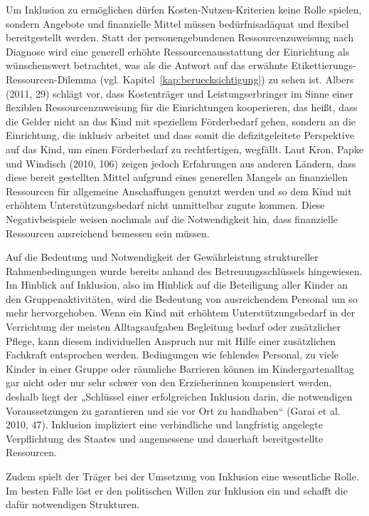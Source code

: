 Um Inklusion zu ermöglichen dürfen Kosten-Nutzen-Kriterien keine Rolle spielen, sondern Angebote und finanzielle Mittel müssen bedürfnisadäquat und flexibel bereitgestellt werden. Statt der personengebundenen Ressourcenzuweisung nach Diagnose wird eine generell erhöhte Ressourcenausstattung der Einrichtung als wünschenswert betrachtet, was als die Antwort auf das erwähnte Etikettierungs-Ressourcen-Dilemma (vgl. Kapitel~\ref{kap:beruecksichtigung}) zu sehen ist. 
Albers (2011, 29) schlägt vor, dass Kostenträger und Leistungserbringer im Sinne einer flexiblen Ressourcenzuweisung für die Einrichtungen kooperieren, das heißt, dass die Gelder nicht an das Kind mit speziellem Förderbedarf gehen, sondern an die Einrichtung, die inklusiv arbeitet und dass somit die defizitgeleitete Perspektive auf das Kind, um einen Förderbedarf zu rechtfertigen, wegfällt. Laut Kron, Papke und Windisch (2010, 106) zeigen jedoch Erfahrungen aus anderen Ländern, dass diese bereit gestellten Mittel aufgrund eines generellen Mangels an finanziellen Ressourcen für allgemeine Anschaffungen genutzt werden und so dem Kind mit erhöhtem Unterstützungsbedarf nicht unmittelbar zugute kommen. Diese Negativbeispiele weisen nochmals auf die Notwendigkeit hin, dass finanzielle Ressourcen ausreichend bemessen sein müssen.

Auf die Bedeutung und Notwendigkeit der Gewährleistung struktureller Rahmenbedingungen wurde bereits anhand des Betreuungsschlüssels hingewiesen. Im Hinblick auf Inklusion, also im Hinblick auf die Beteiligung aller Kinder an den Gruppenaktivitäten, wird die Bedeutung von ausreichendem Personal um so mehr hervorgehoben. Wenn ein Kind mit erhöhtem Unterstützungsbedarf in der Verrichtung der meisten Alltagsaufgaben Begleitung bedarf oder zusätzlicher Pflege, kann diesem individuellen Anspruch nur mit Hilfe einer zusätzlichen Fachkraft entsprochen werden. Bedingungen wie fehlendes Personal, zu viele Kinder in einer Gruppe oder räumliche Barrieren können im Kindergartenalltag gar nicht oder nur sehr schwer von den Erzieherinnen kompensiert werden, deshalb liegt der „Schlüssel einer erfolgreichen Inklusion darin, die notwendigen Voraussetzungen zu garantieren und sie vor Ort zu handhaben“ (Garai et al. 2010, 47). Inklusion impliziert eine verbindliche und langfristig angelegte Verpflichtung des Staates und angemessene und dauerhaft bereitgestellte Ressourcen.

Zudem spielt der Träger bei der Umsetzung von Inklusion eine wesentliche Rolle. Im besten Falle löst er den politischen Willen zur Inklusion ein und schafft die dafür notwendigen Strukturen. 

